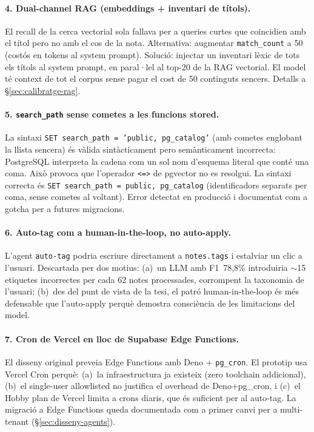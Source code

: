 \paragraph{4. Dual-channel RAG (embeddings + inventari de títols).}
El recall de la cerca vectorial sola fallava per a queries curtes que coincidien amb el títol pero no amb el cos de la nota. Alternativa: augmentar \texttt{match\_count} a 50 (costós en tokens al system prompt). Solució: injectar un inventari lèxic de tots els títols al system prompt, en paral·lel al top-20 de la RAG vectorial. El model té context de tot el corpus sense pagar el cost de 50 continguts sencers. Detalls a \S\ref{sec:calibratge-rag}.

\paragraph{5. \texttt{search\_path} sense cometes a les funcions stored.}
La sintaxi \texttt{SET search\_path = 'public, pg\_catalog'} (amb cometes englobant la llista sencera) és vàlida sintàcticament pero semànticament incorrecta: PostgreSQL interpreta la cadena com un sol nom d'esquema literal que conté una coma. Això provoca que l'operador \texttt{<=>} de pgvector no es resolgui. La sintaxi correcta és \texttt{SET search\_path = public, pg\_catalog} (identificadors separats per coma, sense cometes al voltant). Error detectat en producció i documentat com a gotcha per a futures migracions.

\paragraph{6. Auto-tag com a human-in-the-loop, no auto-apply.}
L'agent \texttt{auto-tag} podria escriure directament a \texttt{notes.tags} i estalviar un clic a l'usuari. Descartada per dos motius: (a)~un LLM amb F1~78{,}8\% introduiria $\sim$15 etiquetes incorrectes per cada 62 notes processades, corrompent la taxonomia de l'usuari; (b)~des del punt de vista de la tesi, el patró human-in-the-loop és més defensable que l'auto-apply perquè demostra consciència de les limitacions del model.

\paragraph{7. Cron de Vercel en lloc de Supabase Edge Functions.}
El disseny original preveia Edge Functions amb Deno + \texttt{pg\_cron}. El prototip usa Vercel Cron perquè: (a)~la infraestructura ja existeix (zero toolchain addicional), (b)~el single-user allowlisted no justifica el overhead de Deno+pg\_cron, i (c)~el Hobby plan de Vercel limita a crons diaris, que és suficient per al auto-tag. La migració a Edge Functions queda documentada com a primer canvi per a multi-tenant (\S\ref{sec:disseny-agents}).

